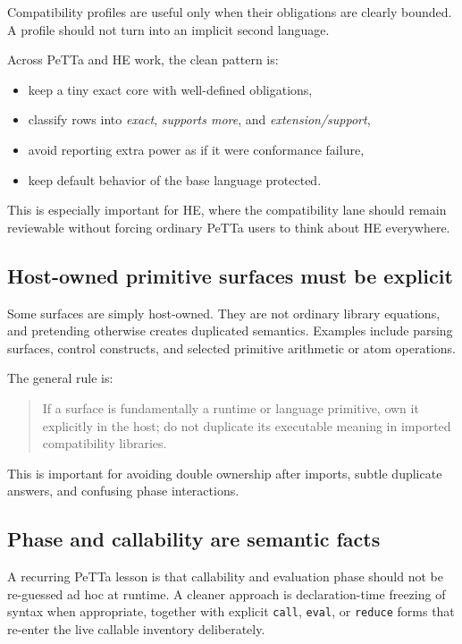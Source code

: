 \documentclass[11pt]{article}
\newcommand{\code}[1]{\texttt{#1}}
\begin{document}
Compatibility profiles are useful only when their obligations are clearly bounded. A profile should not turn into an implicit second language.

Across PeTTa and HE work, the clean pattern is:

\begin{itemize}
  \item keep a tiny exact core with well-defined obligations,
  \item classify rows into \emph{exact}, \emph{supports more}, and \emph{extension/support},
  \item avoid reporting extra power as if it were conformance failure,
  \item keep default behavior of the base language protected.
\end{itemize}

This is especially important for HE, where the compatibility lane should remain reviewable without forcing ordinary PeTTa users to think about HE everywhere.

\subsection{Host-owned primitive surfaces must be explicit}

Some surfaces are simply host-owned. They are not ordinary library equations, and pretending otherwise creates duplicated semantics. Examples include parsing surfaces, control constructs, and selected primitive arithmetic or atom operations.

The general rule is:

\begin{quote}
If a surface is fundamentally a runtime or language primitive, own it explicitly in the host; do not duplicate its executable meaning in imported compatibility libraries.
\end{quote}

This is important for avoiding double ownership after imports, subtle duplicate answers, and confusing phase interactions.

\subsection{Phase and callability are semantic facts}

A recurring PeTTa lesson is that callability and evaluation phase should not be re-guessed ad hoc at runtime. A cleaner approach is declaration-time freezing of syntax when appropriate, together with explicit \code{call}, \code{eval}, or \code{reduce} forms that re-enter the live callable inventory deliberately.
\end{document}
